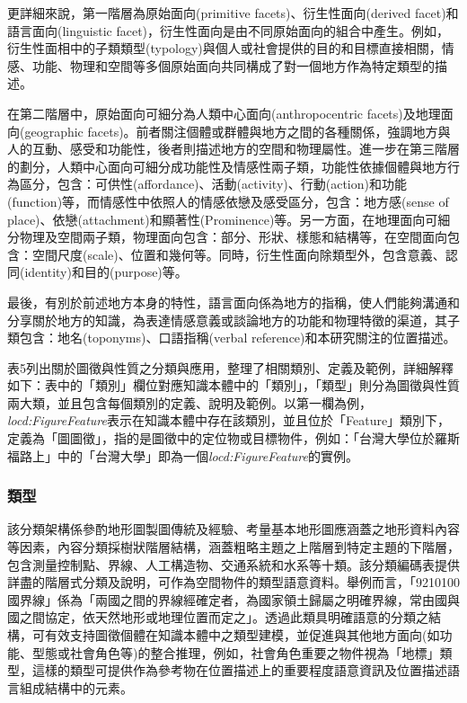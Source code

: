 更詳細來說，第一階層為原始面向(primitive facets)、衍生性面向(derived facet)和語言面向(linguistic facet)，衍生性面向是由不同原始面向的組合中產生。例如，衍生性面相中的子類類型(typology)與個人或社會提供的目的和目標直接相關，情感、功能、物理和空間等多個原始面向共同構成了對一個地方作為特定類型的描述。

在第二階層中，原始面向可細分為人類中心面向(anthropocentric facets)及地理面向(geographic facets)。前者關注個體或群體與地方之間的各種關係，強調地方與人的互動、感受和功能性，後者則描述地方的空間和物理屬性。進一步在第三階層的劃分，人類中心面向可細分成功能性及情感性兩子類，功能性依據個體與地方行為區分，包含：可供性(affordance)、活動(activity)、行動(action)和功能(function)等，而情感性中依照人的情感依戀及感受區分，包含：地方感(sense of place)、依戀(attachment)和顯著性(Prominence)等。另一方面，在地理面向可細分物理及空間兩子類，物理面向包含：部分、形狀、樣態和結構等，在空間面向包含：空間尺度(scale)、位置和幾何等。同時，衍生性面向除類型外，包含意義、認同(identity)和目的(purpose)等。

最後，有別於前述地方本身的特性，語言面向係為地方的指稱，使人們能夠溝通和分享關於地方的知識，為表達情感意義或談論地方的功能和物理特徵的渠道，其子類包含：地名(toponyms)、口語指稱(verbal reference)和本研究關注的位置描述。

表5列出關於圖徵與性質之分類與應用，整理了相關類別、定義及範例，詳細解釋如下：表中的「類別」欄位對應知識本體中的「類別」，「類型」則分為圖徵與性質兩大類，並且包含每個類別的定義、說明及範例。以第一欄為例，\textit{locd:FigureFeature}表示在知識本體中存在該類別，並且位於「Feature」類別下，定義為「圖圖徵」，指的是圖徵中的定位物或目標物件，例如：「台灣大學位於羅斯福路上」中的「台灣大學」即為一個\textit{locd:FigureFeature}的實例。

\subsubsection{類型}


該分類架構係參酌地形圖製圖傳統及經驗、考量基本地形圖應涵蓋之地形資料內容等因素，內容分類採樹狀階層結構，涵蓋粗略主題之上階層到特定主題的下階層，包含測量控制點、界線、人工構造物、交通系統和水系等十類。該分類編碼表提供詳盡的階層式分類及說明，可作為空間物件的類型語意資料。舉例而言，「9210100國界線」係為「兩國之間的界線經確定者，為國家領土歸屬之明確界線，常由國與國之間協定，依天然地形或地理位置而定之」。透過此類具明確語意的分類之結構，可有效支持圖徵個體在知識本體中之類型建模，並促進與其他地方面向(如功能、型態或社會角色等)的整合推理，例如，社會角色重要之物件視為「地標」類型，這樣的類型可提供作為參考物在位置描述上的重要程度語意資訊及位置描述語言組成結構中的元素。

